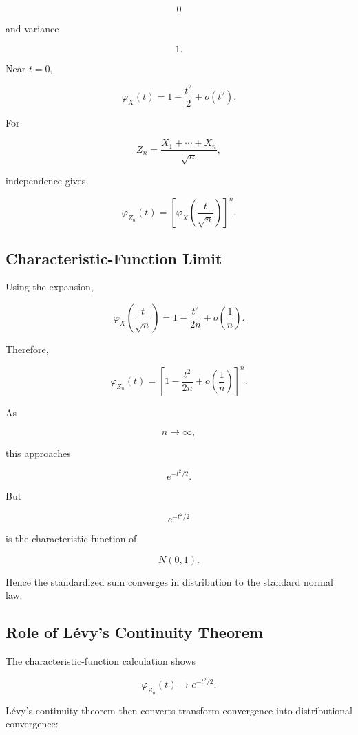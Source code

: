 \[
0
\]

and variance

\[
1.
\]

Near \(t=0\),

\[
\varphi_X(t)
=
1-\frac{t^2}{2}+o(t^2).
\]

For

\[
Z_n
=
\frac{
X_1+\cdots+X_n
}{
\sqrt{n}
},
\]

independence gives

\[
\varphi_{Z_n}(t)
=
\left[
\varphi_X
\left(
\frac{t}{\sqrt{n}}
\right)
\right]^n.
\]

\subsection{Characteristic-Function Limit}
\label{subsec:cf-clt-limit}

Using the expansion,

\[
\varphi_X
\left(
\frac{t}{\sqrt{n}}
\right)
=
1
-
\frac{t^2}{2n}
+
o\left(
\frac1n
\right).
\]

Therefore,

\[
\varphi_{Z_n}(t)
=
\left[
1
-
\frac{t^2}{2n}
+
o\left(
\frac1n
\right)
\right]^n.
\]

As

\[
n\to\infty,
\]

this approaches

\[
\boxed{
e^{-t^2/2}.
}
\]

But

\[
e^{-t^2/2}
\]

is the characteristic function of

\[
N(0,1).
\]

Hence the standardized sum converges in distribution to the standard
normal law.

\subsection{Role of Lévy's Continuity Theorem}
\label{subsec:levy-role-clt}

The characteristic-function calculation shows

\[
\varphi_{Z_n}(t)
\to
e^{-t^2/2}.
\]

Lévy's continuity theorem then converts transform convergence into
distributional convergence:

